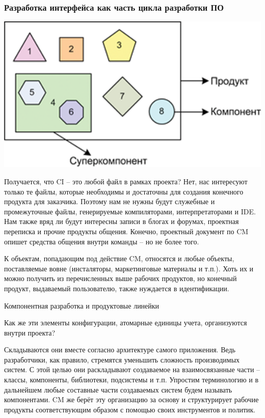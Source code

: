 \documentclass{../industrial-development}
\begin{document}
\begin{frame} \frametitle{Разработка интерфейса как часть цикла разработки ПО}
 \includegraphics[width=\textwidth]{component}
\end{frame}

\lecturenotes

Получается, что CI – это любой файл в рамках проекта? Нет, нас интересуют только те файлы, которые необходимы и достаточны для создания конечного продукта для заказчика. Поэтому нам не нужны будут служебные и промежуточные файлы, генерируемые компиляторами, интерпретаторами и IDE. Нам также вряд ли будут интересны записи в блогах и форумах, проектная переписка и прочие продукты общения. Конечно, проектный документ по CM опишет средства общения внутри команды – но не более того.

К объектам, попадающим под действие CM, относятся и любые объекты, поставляемые вовне (инсталяторы, маркетинговые материалы и т.п.). Хоть их и можно получить из перечисленных выше рабочих продуктов, но конечный продукт, выдаваемый пользователю, также нуждается в идентификации.

Компонентная разработка и продуктовые линейки

Как же эти элементы конфигурации, атомарные единицы учета, организуются внутри проекта?

Складываются они вместе согласно архитектуре самого приложения. Ведь разработчики, как правило, стремятся уменьшить сложность производимых систем. С этой целью они раскладывают создаваемое на взаимосвязанные части – классы, компоненты, библиотеки, подсистемы и т.п. Упростим терминологию и в дальнейшем любые составные части создаваемых систем будем называть компонентами. CM же берёт эту организацию за основу и структурирует рабочие продукты соответствующим образом с помощью своих инструментов и политик.
\end{document}
